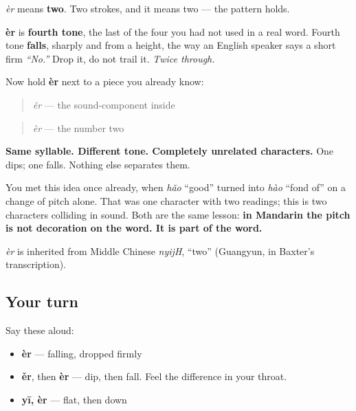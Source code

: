 \begin{sounds}
\textbf{} \emph{èr} means \textbf{two}. Two strokes, and it means two — the pattern holds.

\textbf{èr} is \textbf{fourth tone}, the last of the four you had not used in a real word. Fourth tone \textbf{falls}, sharply and from a height, the way an English speaker says a short firm \emph{\textquotedblleft{}No.\textquotedblright{}} Drop it, do not trail it. \emph{Twice through.}

Now hold \textbf{èr} next to a piece you already know:

\begin{quote}
 \emph{ěr} — the sound-component inside 
\end{quote}

\begin{quote}
 \emph{èr} — the number two
\end{quote}

\textbf{Same syllable. Different tone. Completely unrelated characters.} One dips; one falls. Nothing else separates them.

You met this idea once already, when  \emph{hǎo} \textquotedblleft{}good\textquotedblright{} turned into  \emph{hào} \textquotedblleft{}fond of\textquotedblright{} on a change of pitch alone. That was one character with two readings; this is two characters colliding in sound. Both are the same lesson: \textbf{in Mandarin the pitch is not decoration on the word. It is part of the word.}
\end{sounds}

\begin{cousinweb}
\textbf{} \emph{èr} is inherited from Middle Chinese \emph{nyijH}, \textquotedblleft{}two\textquotedblright{} (Guangyun, in Baxter's transcription).
\end{cousinweb}

\subsection*{Your turn}
Say these aloud:

\begin{itemize}
\raggedright
  \item \textbf{èr} — falling, dropped firmly
  \item \textbf{ěr}, then \textbf{èr} — dip, then fall. Feel the difference in your throat.
  \item \textbf{yī, èr} — flat, then down
\end{itemize}

